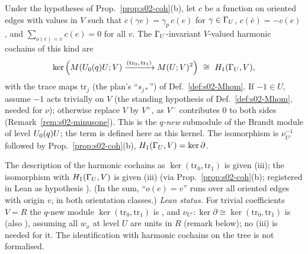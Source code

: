 \begin{proposition}\label{prop:s02-harm}
Under the hypotheses of Prop.~\ref{prop:s02-coh}(b), let $c$ be a function on oriented edges with values in $V$
such that $c(\gamma e)=\gamma_p\,c(e)$ for $\gamma\in\Gamma_U$, $c(\bar e)=-c(e)$, and $\sum_{o(e)=v}c(e)=0$ for all
$v$. The $\Gamma_U$-invariant $V$-valued harmonic cochains of this kind are
\[\ker\Big(\Brandt{\Uzero{q}U}{V}\xrightarrow{(\mathrm{tr}_0,\,\mathrm{tr}_1)}\Brandt{U}{V}^{2}\Big)\ \cong\ H_1(\GU,V),\]
with the trace maps $\mathrm{tr}_j$ (the plan's ``$s_{j*}$'') of Def.~\ref{def:s02-Mhom}. If $-1\in U$, assume $-1$ acts trivially on $V$
(the standing hypothesis of Def.~\ref{def:s02-Mhom}, needed for $\nu$); otherwise replace $V$ by $V^+$, as $V^-$ contributes $0$ to both sides
(Remark~\ref{rem:s02-minusone}). This is the \emph{$q$-new} submodule of the Brandt
module of level $U_0(q)U$; the term is defined here as this kernel. The isomorphism is $\nu_{U'}^{-1}$ followed by
Prop.~\ref{prop:s02-coh}(b), $H_1(\Gamma_U,V)=\ker\partial$.
\end{proposition}
\noindent The description of the harmonic cochains as $\ker(\mathrm{tr}_0,\mathrm{tr}_1)$ is \stproved{} given (iii); the isomorphism with
$H_1(\Gamma_U,V)$ is \stpmc{} given (iii) (via Prop.~\ref{prop:s02-coh}(b); registered in Lean as hypothesis ). (In
the sum, ``$o(e)=v$'' runs over all oriented edges with origin $v$, in both orientation classes.)
\emph{Lean status.} For trivial coefficients $V=R$ the $q$-new module $\ker(\mathrm{tr}_0,\mathrm{tr}_1)$ is
, and $\nu_{U'}:\ker\partial\cong\ker(\mathrm{tr}_0,\mathrm{tr}_1)$ is \stformal{}
 (also ), assuming all $w_x$
at level $U$ are units in $R$ (remark below); no (iii) is needed for it. The identification with harmonic cochains on the tree is not
formalised.
